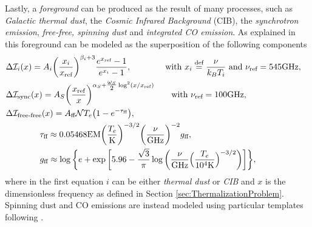 Lastly, a \emph{foreground} can be produced as the result of many processes, such as \emph{Galactic thermal dust}, the \emph{Cosmic Infrared Background} (CIB), the \emph{synchrotron emission}, \emph{free-free, spinning dust} and \emph{integrated CO emission}. As explained in \cite{constraininginflationarypotentialspectral} this foreground can be modeled as the superposition of the following components
\begin{align}
    &\Delta \mathcal I_i(x)=A_i\bigg(\frac{x_i}{x_{\text{ref}}}\bigg)^{\beta_i+3} \frac{e^{x_{\text{ref}}}-1}{e^{x_i}-1},\qquad\qquad\text{with } x_i\stackrel{\text{def}}{=}\frac{\nu}{k_BT_i}\text{ and } \nu_\text{ref}=545\text{GHz},\label{eq:FOR_i}\\
    &\Delta \mathcal{I}_\text{sync} (x)= A_S\bigg(\frac{x_\text{ref}}{x}\bigg)^{\alpha_S+\tfrac{\omega_S}2\log^2(x/x_\text{ref})}\qquad \text{with }\nu_\text{ref}=100\text{GHz},\label{eq:FOR_sync}\\\nonumber
    &\Delta \mathcal{I}_\text{free-free}(x)= A_\text{ff} \mathcal{ N} T_e\big(1-e^{-\tau_{\text{ff}}}\big),&\\
    &\qquad\qquad\tau_\text{ff}\approx 0.05468\text{EM}\bigg(\frac{T_e}{\text{K}}\bigg)^{-3/2}\bigg(\frac{\nu}{\text{GHz}}\bigg)^{-2}g_\text{ff},& \\ &\qquad\qquad g_\text{ff}\approx \log\bigg\{ e+\exp\bigg[5.96-\frac{\sqrt{3}}{\pi}\log\bigg(\frac{\nu}{\text{GHz}}\Big(\frac{T_e}{10^4\text{K}}\Big)^{-3/2}\bigg)\bigg]\bigg\},\nonumber
\end{align}  
where in the first equation $i$ can be either \emph{thermal dust} or \emph{CIB} and $x$ is the dimensionless frequency as defined in Section \ref{sec:ThermalizationProblem}. Spinning dust and CO emissions are instead modeled using particular templates following \cite{refId0,10.1093/mnras/stx1653}.

